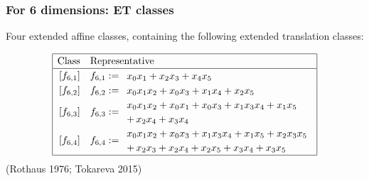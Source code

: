 \documentclass[pdf,sprung,slideColor,nocolorBG]{beamer}
\newenvironment{colortheme}[1]{
\def\ProvidesPackageRCS $##1${\relax}
\renewcommand{\ProcessOptions}{\relax}
\makeatletter

\makeatother
}{}
\newcommand{\slidecite}[1]{\tiny{(#1)}\normalsize{}}
\begin{document}
\begin{colortheme}{seagull}

\begin{frame}
\frametitle{For 6 dimensions: ET classes}

Four extended affine classes, containing the following extended translation classes:

\begin{align*}
\def\arraystretch{1.2}
\begin{array}{|cl|}
\hline
\text{Class} &
\text{Representative}
\\
\hline
\,[f_{6,1}] & f_{6,1} :=
\begin{array}{l}
x_{0} x_{1} + x_{2} x_{3} + x_{4} x_{5}
\end{array}
\\
\,[f_{6,2}] & f_{6,2} :=
\begin{array}{l}
x_{0} x_{1} x_{2} + x_{0} x_{3} + x_{1} x_{4} + x_{2} x_{5}
\end{array}
\\
\,[f_{6,3}] & f_{6,3} :=
\begin{array}{l}
x_{0} x_{1} x_{2} + x_{0} x_{1} + x_{0} x_{3} + x_{1} x_{3} x_{4} + x_{1} x_{5}
\\
 +\, x_{2} x_{4} + x_{3} x_{4}
\end{array}
\\
\,[f_{6,4}] & f_{6,4} :=
\begin{array}{l}
x_{0} x_{1} x_{2} + x_{0} x_{3} + x_{1} x_{3} x_{4} + x_{1} x_{5} + x_{2} x_{3} x_{5}
\\
 +\, x_{2} x_{3} + x_{2} x_{4} + x_{2} x_{5} + x_{3} x_{4} + x_{3} x_{5}
\end{array}
\\
\hline
\end{array}
\end{align*}
\slidecite{Rothaus 1976; Tokareva 2015}
\end{frame}

\end{colortheme}
\end{document}
